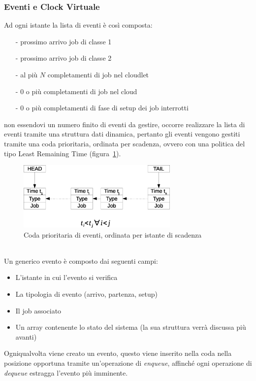 \subsubsection{Eventi e Clock Virtuale}
Ad ogni istante la lista di eventi è così composta:
\begin{itemize}
\item[-]prossimo arrivo job di classe 1
\item[-]prossimo arrivo job di classe 2
\item[-]al più $N$ completamenti di job nel cloudlet
\item[-]$0$ o più completamenti di job nel cloud
\item[-]$0$ o più completamenti di fase di setup dei job interrotti
\end{itemize}
non essendovi un numero finito di eventi da gestire, occorre realizzare la lista
di eventi tramite una struttura dati dinamica, pertanto gli eventi vengono
gestiti tramite una coda prioritaria, ordinata per scadenza, ovvero con una
politica del tipo Least Remaining Time (figura~\ref{eventq}).
%
\begin{figure}[!h]
\centering
\includegraphics[width=0.7\textwidth]{figures/eventq}
\caption{Coda prioritaria di eventi, ordinata per istante di scadenza}
\label{eventq}
\end{figure}
%
\\Un generico evento è composto dai seguenti campi:
\begin{itemize}
\item L’istante in cui l’evento si verifica
\item La tipologia di evento (arrivo, partenza, setup)
\item Il job associato
\item Un array contenente lo stato del sistema (la sua struttura verrà discussa
più avanti)
\end{itemize}

Ogniqualvolta viene creato un evento, questo viene inserito nella coda nella
posizione opportuna tramite un’operazione di \emph{enqueue}, affinché ogni 
operazione di \emph{dequeue} estragga l’evento più imminente.

